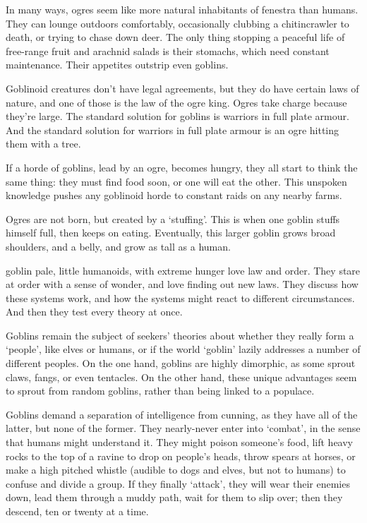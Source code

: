 \begin{multicols}{2}

\noindent
In many ways, ogres seem like more natural inhabitants of \gls{fenestra} than humans.
They can lounge outdoors comfortably, occasionally clubbing a chitincrawler to death, or trying to chase down deer.
The only thing stopping a peaceful life of free-range fruit and arachnid salads is their stomachs, which need constant maintenance.
Their appetites outstrip even goblins.

Goblinoid creatures don't have legal agreements, but they do have certain laws of nature, and one of those is the law of the ogre king.
Ogres take charge because they're large.
The standard solution for goblins is warriors in full plate armour.
And the standard solution for warriors in full plate armour is an ogre hitting them with a tree.

If a horde of goblins, lead by an ogre, becomes hungry, they all start to think the same thing: they must find food soon, or one will eat the other.
This unspoken knowledge pushes any goblinoid horde to constant raids on any nearby farms.

Ogres are not born, but created by a `stuffing'.
This is when one goblin stuffs himself full, then keeps on eating.
Eventually, this larger goblin grows broad shoulders, and a belly, and grow as tall as a human.

  {goblin}%
  {pale, little humanoids, with extreme hunger}%
love law and order.
They stare at order with a sense of wonder, and love finding out new laws.
They discuss how these systems work, and how the systems might react to different circumstances.
And then they test every theory at once.

Goblins remain the subject of \glspl{seeker}' theories about whether they really form a `people', like elves or humans, or if the world `goblin' lazily addresses a number of different peoples.
On the one hand, goblins are highly dimorphic, as some sprout claws, fangs, or even tentacles.
On the other hand, these unique advantages seem to sprout from random goblins, rather than being linked to a populace.

Goblins demand a separation of intelligence from cunning, as they have all of the latter, but none of the former.
They nearly-never enter into `combat', in the sense that humans might understand it.
They might poison someone's food, lift heavy rocks to the top of a ravine to drop on people's heads, throw spears at horses, or make a high pitched whistle (audible to dogs and elves, but not to humans) to confuse and divide a group.
If they finally `attack', they will wear their enemies down, lead them through a muddy path, wait for them to slip over; then they descend, ten or twenty at a time.


\end{multicols}
